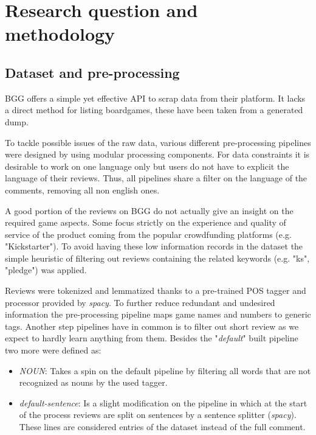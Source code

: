 \section{Research question and methodology}

\subsection{Dataset and pre-processing}
BGG offers a simple yet effective API to scrap data from their platform.
It lacks a direct method for listing boardgames, these have been taken from a generated dump.

To tackle possible issues of the raw data, various different pre-processing pipelines were designed
by using modular processing components.
For data constraints it is desirable to work on one language only but users do not have to explicit the language of their reviews.
Thus, all pipelines share a filter on the language of the comments, removing all non english ones.

A good portion of the reviews on BGG do not actually give an insight on the required game aspects.
Some focus strictly on the experience and quality of service of the product coming from the popular crowdfunding platforms (e.g. "Kickstarter").
To avoid having these low information records in the dataset the simple heuristic of filtering out reviews containing the related keywords (e.g. "ks", "pledge") was applied.

Reviews were tokenized and lemmatized thanks to a pre-trained POS tagger and processor provided by \textit{spacy}.
To further reduce redundant and undesired information the pre-processing pipeline maps game names and numbers to generic tags.
Another step pipelines have in common is to filter out short review as we expect to hardly learn anything from them.
Besides the "\textit{default}" built pipeline two more were defined as:
\begin{itemize}
    \item {\textit{NOUN}}: Takes a spin on the default pipeline by filtering all words that are not recognized as nouns
    by the used tagger. %

    \item {\textit{default-sentence}}: Is a slight modification on the  pipeline in which
    at the start of the process reviews are split on sentences by a sentence splitter (\textit{spacy}).
    These lines are considered entries of the dataset instead of the full comment.
\end{itemize}

